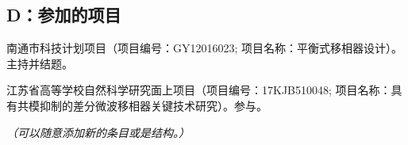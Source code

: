 \begin{achievement}
\section*{D：参加的项目}

{
\begin{backitem}
\item 南通市科技计划项目（项目编号：GY12016023; 项目名称：平衡式移相器设计）。主持并结题。
\item 江苏省高等学校自然科学研究面上项目（项目编号：17KJB510048; 项目名称：具有共模抑制的差分微波移相器关键技术研究）。参与。
\end{backitem}
}


\emph{（可以随意添加新的条目或是结构。）}


\end{achievement}






